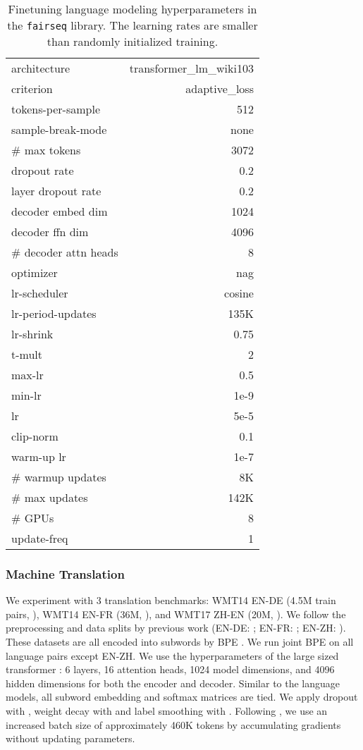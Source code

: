 \documentclass[11pt,a4paper]{article}
\begin{document}
\begin{table}[h]
\small
\centering
\begin{tabular}{ |l r|}
\hline
architecture & transformer\_lm\_wiki103\\
criterion & adaptive\_loss \\
tokens-per-sample & 512 \\
sample-break-mode & none \\
\# max tokens & 3072\\
dropout rate & 0.2\\
layer dropout rate & 0.2\\
decoder embed dim  & 1024\\
decoder ffn dim  & 4096\\
\# decoder attn heads & 8\\
optimizer &  nag \\
lr-scheduler &  cosine \\
lr-period-updates &  135K \\
lr-shrink & 0.75 \\
t-mult & 2 \\
max-lr & 0.5 \\
min-lr & 1e-9 \\
lr &  5e-5 \\
clip-norm & 0.1\\
warm-up lr & 1e-7 \\
\# warmup updates & 8K \\
\# max updates &  142K \\
\# GPUs & 8 \\
update-freq & 1\\
\hline
\end{tabular}
\caption{Finetuning language modeling hyperparameters in the \texttt{fairseq} library. The learning rates are smaller than randomly initialized training.}
\label{tab:lm-ft-hyp}
\end{table}

\subsubsection{Machine Translation}
We experiment with 3 translation benchmarks: WMT14 EN-DE (4.5M train pairs, \citealp{wmt2016-findings}), WMT14 EN-FR (36M, \citealp{wmt2014-findings}), and WMT17 ZH-EN (20M, \citealp{wmt2017-findings}).
We follow the preprocessing and data splits by previous work (EN-DE: \citealp{Vaswani2017AttentionIA}; EN-FR: \citealp{Gehring2017ConvolutionalST}; EN-ZH: \citealp{Hassan2018AchievingHP, wu2018pay}).
These datasets are all encoded into subwords by BPE \cite{sennrich-etal-2016-neural}.
We run joint BPE on all language pairs except EN-ZH.
We use the hyperparameters of the large sized transformer \cite{Vaswani2017AttentionIA}: 6 layers, 16 attention heads, 1024 model dimensions, and 4096 hidden dimensions for both the encoder and decoder.
Similar to the language models, all subword embedding and softmax matrices are tied.
We apply dropout with , weight decay with  and label smoothing with .
Following \citet{Ott2018ScalingNM}, we use an increased batch size of approximately 460K tokens by accumulating gradients without updating parameters.
\end{document}
